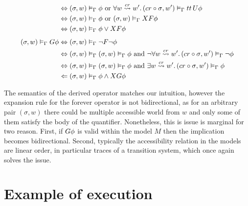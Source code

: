 \begin{align}
    &\Leftrightarrow ({\sigma}, {w}) \vDash_{\Gamma} {\phi} \text{ or }
        \forall {w \overset{cr}{\rightsquigarrow} w'} \ldotp {({cr \circ \sigma}, {w'}) \vDash_{\Gamma} {{tt}\,U {\phi}}} \notag \\
    &\Leftrightarrow ({\sigma}, {w}) \vDash_{\Gamma} {\phi} \text{ or } ({\sigma}, {w}) \vDash_{\Gamma} {X{F{\phi}}} \notag \\
    &\Leftrightarrow ({\sigma}, {w}) \vDash_{\Gamma} {\phi} \lor X{F{\phi}} \label{eq:eventuallysem} \\[1ex]
  ({\sigma}, {w}) \vDash_{\Gamma} {G{\phi}}
    &\Leftrightarrow ({\sigma}, {w}) \vDash_{\Gamma} {\neg F{\neg\phi}} \notag \\
    &\Leftrightarrow ({\sigma}, {w}) \vDash_{\Gamma} {({\sigma}, {w}) \vDash_{\Gamma} {\phi} \text{ and }
        \neg\forall {w \overset{cr}{\rightsquigarrow} w'} \ldotp {({cr \circ \sigma}, {w'}) \vDash_{\Gamma} {\neg\phi}}} \notag \\
    &\Leftrightarrow ({\sigma}, {w}) \vDash_{\Gamma} {({\sigma}, {w}) \vDash_{\Gamma} {\phi} \text{ and }
        \exists {w \overset{cr}{\rightsquigarrow} w'} \ldotp {({cr \circ \sigma}, {w'}) \vDash_{\Gamma} {\phi}}} \notag \\
    &\Leftarrow ({\sigma}, {w}) \vDash_{\Gamma} {\phi \land X{G{\phi}}} \label{eq:foreversem}
\end{align}

The semantics of the derived operator matches our intuition, however the expansion rule for the forever operator is not
bidirectional, as for an arbitrary pair $(\sigma, w)$ there could be multiple accessible world from $w$ and only some of
them satisfy the body of the quantifier. Nonetheless, this is issue is marginal for two reason. First, if
$G{\phi}$ is valid within the model $M$ then the implication becomes bidirectional. Second, typically the
accessibility relation in the models are linear order, in particular traces of a transition system, which once again
solves the issue.

\section{Example of execution}

